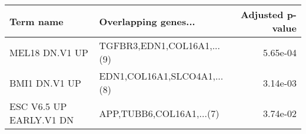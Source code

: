 \begin{tabular}{llr}
\toprule
              Term name &        Overlapping genes... &  Adjusted p-value \\
\midrule
         MEL18 DN.V1 UP &  TGFBR3,EDN1,COL16A1,...(9) &          5.65e-04 \\
          BMI1 DN.V1 UP & EDN1,COL16A1,SLCO4A1,...(8) &          3.14e-03 \\
ESC V6.5 UP EARLY.V1 DN &    APP,TUBB6,COL16A1,...(7) &          3.74e-02 \\
\bottomrule
\end{tabular}
